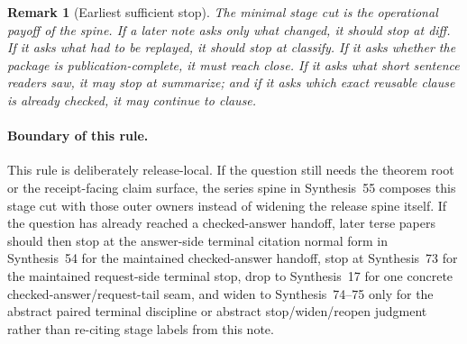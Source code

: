 \documentclass[11pt]{article}
\newtheorem{remark}{Remark}
\begin{document}
\begin{remark}[Earliest sufficient stop]
The minimal stage cut is the operational payoff of the spine. If a later note asks only what changed, it should stop at \textsf{diff}. If it asks what had to be replayed, it should stop at \textsf{classify}. If it asks whether the package is publication-complete, it must reach \textsf{close}. If it asks what short sentence readers saw, it may stop at \textsf{summarize}; and if it asks which exact reusable clause is already checked, it may continue to \textsf{clause}.
\end{remark}

\paragraph{Boundary of this rule.} This rule is deliberately release-local. If the question still needs the theorem root or the receipt-facing claim surface, the series spine in Synthesis~55 composes this stage cut with those outer owners instead of widening the release spine itself. If the question has already reached a checked-answer handoff, later terse papers should then stop at the answer-side terminal citation normal form in Synthesis~54 for the maintained checked-answer handoff, stop at Synthesis~73 for the maintained request-side terminal stop, drop to Synthesis~17 for one concrete checked-answer/request-tail seam, and widen to Synthesis~74--75 only for the abstract paired terminal discipline or abstract stop/widen/reopen judgment rather than re-citing stage labels from this note.\cite{series:seriesspines,series:challengeanswerreviewmenus,series:pairedterminalcitationdiscipline,series:pairedterminalcutoverrules,series:workedexample}
\end{document}
